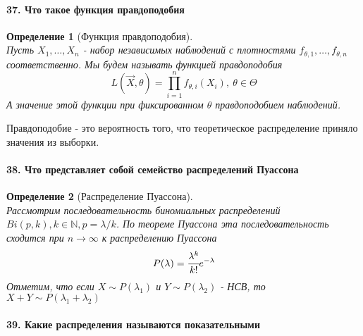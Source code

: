 \documentclass[titlepage]{article}
\newcommand{\N}{\mathbb{N}} %
\newtheorem{definition}{Определение}
\begin{document}
\paragraph{37. Что такое функция правдоподобия}
\begin{definition}[Функция правдоподобия] ~\\
	Пусть $X_1,\dots,X_n$ - набор независимых наблюдений с плотностями $f_{\theta,1},\dots,f_{\theta,n}$ соответственно. Мы будем называть функцией правдоподобия
	\[L(\vec X, \theta) = \prod_{i=1}^nf_{\theta,i}(X_i),\ \theta \in \Theta\]
	А значение этой функции при фиксированном $\theta$ правдоподобием наблюдений.
\end{definition}
Правдоподобие - это вероятность того, что теоретическое распределение приняло значения из выборки.
\paragraph{38. Что представляет собой семейство распределений Пуассона}
\begin{definition}[Распределение Пуассона] ~\\
	Рассмотрим последовательность биномиальных распределений $Bi(p,k),k \in \N, p = \lambda/k$. По теореме Пуассона эта последовательность сходится при $n\rightarrow\infty$ к распределению Пуассона
	\[P(\lambda) = \cfrac{\lambda^k}{k!}e^{-\lambda}\]
	Отметим, что если $X \sim P(\lambda_1)$ и $Y \sim P(\lambda_2)$ - НСВ, то $X + Y \sim P(\lambda_1 + \lambda_2)$
\end{definition}
\paragraph{39. Какие распределения называются показательными}
\end{document}

